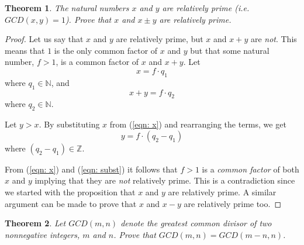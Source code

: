\documentclass[a4paper]{article}
\newtheorem{theorem}{Theorem}
\begin{document}
\begin{theorem}
    \label{theorem: rel-prime}
    The natural numbers $x$ and $y$ are relatively prime (i.e. $GCD(x, y) = 1$). Prove that $x$ and $x \pm y$ are relatively prime.
\end{theorem} 
\begin{proof}
    Let us say that $x$ and $y$ are relatively prime, but $x$ and $x + y$ are \emph{not}.
    This means that $1$ is the only common factor of $x$ and $y$ but that some natural number, $f > 1$, is a common factor of $x$ and $x + y$.
    Let
    \begin{equation}
        \label{eqn: x}
        x = f\cdot q_{1}
    \end{equation}
    where $q_{1} \in \mathbb{N}$, and
    \begin{equation}
        \label{eqn: x+y}
        x + y = f\cdot q_{2}
    \end{equation}
    where $q_{2} \in \mathbb{N}$. 
    
    Let $y > x$. By substituting $x$ from (\ref{eqn: x}) and rearranging the terms, we get
    \begin{equation}
        \label{eqn: subst}
        y = f\cdot(q_2 - q_1)
    \end{equation}
    where $(q_2 - q_1) \in \mathbb{Z}$.

    From (\ref{eqn: x}) and (\ref{eqn: subst}) it follows that $f > 1$ is a \emph{common factor} of both $x$ and $y$ implying that they are \emph{not} relatively prime. This is a contradiction since we started with the proposition that $x$ and $y$ are relatively prime. A similar argument can be made to prove that $x$ and $x - y$ are relatively prime too.

\end{proof}
\begin{theorem}
    \label{theorem: euclid-gcd}
    Let $GCD(m, n)$ denote the greatest common divisor of two nonnegative integers, $m$ and $n$. Prove that $GCD(m, n) = GCD(m-n, n)$.
\end{theorem} 
\end{document}
